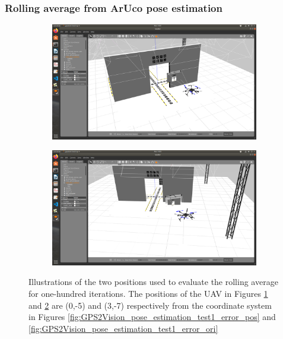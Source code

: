 \documentclass[../Head/report.tex]{subfiles}
\begin{document}
\subsubsection{Rolling average from ArUco pose estimation}
\label{sec:rolling_average_aruco_pose_estimation}

\begin{figure}[H]
    \centering
    \begin{subfigure}[t]{.30\textwidth}
        \centering
        \includegraphics[width=\textwidth]{../Figures/analyse_rolling_average/optimal_pose.png}
        \caption{}
        \label{fig:rolling_average_good_pos}
    \end{subfigure}
    \hspace{0.5em}
    \begin{subfigure}[t]{.30\textwidth}
        \centering
        \includegraphics[width=\textwidth]{../Figures/analyse_rolling_average/bad_pose.png}
        \caption{}
        \label{fig:rolling_average_bad_pos}
    \end{subfigure}
    \caption{Illustrations of the two positions used to evaluate the rolling average for one-hundred iterations. The positions of the UAV in Figures \ref{fig:rolling_average_good_pos} and \ref{fig:rolling_average_bad_pos} are (0,-5) and (3,-7) respectively from the coordinate system in Figures \ref{fig:GPS2Vision_pose_estimation_test1_error_pos} and \ref{fig:GPS2Vision_pose_estimation_test1_error_ori}} 
    \label{fig:rolling_average_pos}
\end{figure}
\end{document}
